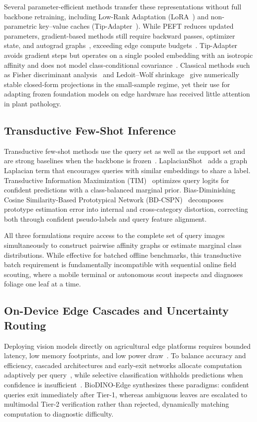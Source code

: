 Several parameter-efficient methods transfer these representations without full backbone retraining, including Low-Rank Adaptation (LoRA~\cite{hu2022lora}) and non-parametric key--value caches (Tip-Adapter~\cite{zhang2022tip}). While PEFT reduces updated parameters, gradient-based methods still require backward passes, optimizer state, and autograd graphs~\cite{hu2022lora}, exceeding edge compute budgets~\cite{radocaj2025evolution}. Tip-Adapter avoids gradient steps but operates on a single pooled embedding with an isotropic affinity and does not model class-conditional covariance~\cite{zhang2022tip}. Classical methods such as Fisher discriminant analysis~\cite{fisher1936use} and Ledoit--Wolf shrinkage~\cite{ledoit2004well} give numerically stable closed-form projections in the small-sample regime, yet their use for adapting frozen foundation models on edge hardware has received little attention in plant pathology.

\subsection{Transductive Few-Shot Inference}
Transductive few-shot methods use the query set as well as the support set and are strong baselines when the backbone is frozen~\cite{boudiaf2020transductive,ziko2020laplacian}. LaplacianShot~\cite{ziko2020laplacian} adds a graph Laplacian term that encourages queries with similar embeddings to share a label. Transductive Information Maximization (TIM)~\cite{boudiaf2020transductive} optimizes query logits for confident predictions with a class-balanced marginal prior. Bias-Diminishing Cosine Similarity-Based Prototypical Network (BD-CSPN)~\cite{liu2020bdcspn} decomposes prototype estimation error into internal and cross-category distortion, correcting both through confident pseudo-labels and query feature alignment.

All three formulations require access to the complete set of query images simultaneously to construct pairwise affinity graphs or estimate marginal class distributions. While effective for batched offline benchmarks, this transductive batch requirement is fundamentally incompatible with sequential online field scouting, where a mobile terminal or autonomous scout inspects and diagnoses foliage one leaf at a time.

\subsection{On-Device Edge Cascades and Uncertainty Routing}
Deploying vision models directly on agricultural edge platforms requires bounded latency, low memory footprints, and low power draw~\cite{radocaj2025evolution,sharif2026real}. To balance accuracy and efficiency, cascaded architectures and early-exit networks allocate computation adaptively per query~\cite{viola2001rapid,teerapittayanon2016branchynet}, while selective classification withholds predictions when confidence is insufficient~\cite{geifman2017selective,traub2024overcoming}. BioDINO-Edge synthesizes these paradigms: confident queries exit immediately after Tier-1, whereas ambiguous leaves are escalated to multimodal Tier-2 verification rather than rejected, dynamically matching computation to diagnostic difficulty.

